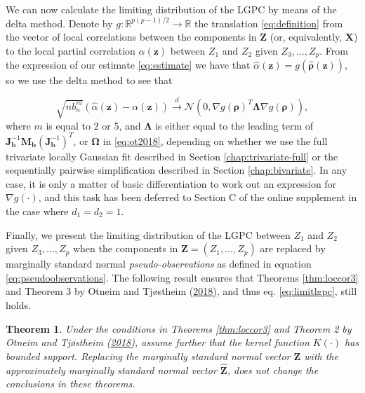 \documentclass[
  12pt,
  letterpaper]{article}
\newcommand{\X}{\bm{X}}
\newcommand{\Z}{\bm{Z}}
\newcommand{\z}{\bm{z}}
\newcommand{\hZ}{\widehat{\bm{Z}}}
\newcommand{\frho}{\bm{\rho}}
\newcommand{\hfrho}{\widehat{\bm{\rho}}}
\newcommand{\hh}{\bm{b}}
\newcommand{\halpha}{\widehat{\alpha}}
\newcommand{\fOmega}{\bm{\Omega}}
\newcommand{\fLambda}{\bm{\Lambda}}
\newcommand{\Jb}{\bm{J}_{\hh}}
\newcommand{\Mb}{\bm{M}_{\hh}}
\newtheorem{theorem}{Theorem}[section]
\theoremstyle{definition}
\theoremstyle{definition}
\theoremstyle{definition}
\theoremstyle{remark}
\begin{document}
We can now calculate the limiting distribution of the LGPC by means of the delta method. Denote by \(g: \mathbb{R}^{p(p-1)/2} \rightarrow \mathbb{R}\) the translation \eqref{eq:definition} from the vector of local correlations between the components in \(\Z\) (or, equivalently, \(\X\)) to the local partial correlation \(\alpha(\z)\) between \(Z_1\) and \(Z_2\) given \(Z_3, \ldots, Z_p\). From the expression of our estimate \eqref{eq:estimate} we have that \(\halpha(\z) = g(\hfrho(\z))\), so we use the delta method to see that

\begin{equation}
\sqrt{nb_n^m}\left(\halpha(\z) - \alpha(\z)\right) \stackrel{d}{\rightarrow} \mathcal{N}\left(0, \nabla g(\frho)^T\fLambda\nabla g(\frho)\right),
\label{eq:limitlgpc}
\end{equation}
where \(m\) is equal to 2 or 5, and \(\fLambda\) is either equal to the leading term of \(\Jb^{-1}\Mb(\Jb^{-1})^T\), or \(\fOmega\) in \eqref{eq:ot2018}, depending on whether we use the full trivariate locally Gaussian fit described in Section \ref{chap:trivariate-full} or the sequentially pairwise simplification described in Section \ref{chap:bivariate}. In any case, it is only a matter of basic differentiation to work out an expression for \(\nabla g(\cdot)\), and this task has been deferred to Section C of the online supplement in the case where \(d_1 = d_2 = 1\).

Finally, we present the limiting distribution of the LGPC between \(Z_1\) and \(Z_2\) given \(Z_3, \ldots, Z_p\) when the components in \(\Z = (Z_1, \ldots, Z_p)\) are replaced by marginally standard normal \emph{pseudo-observations} as defined in equation \eqref{eq:pseudoobservations}. The following result ensures that Theorems \ref{thm:loccor3} and Theorem 3 by Otneim and Tjøstheim (\protect\hyperlink{ref-otneim2017conditional}{2018}), and thus eq. \eqref{eq:limitlgpc}, still holds.

\vspace{.5cm}

\begin{theorem}
\protect\hypertarget{thm:pseudo}{}{\label{thm:pseudo} }Under the conditions in Theorems \ref{thm:loccor3} and Theorem 2 by Otneim and Tjøstheim (\protect\hyperlink{ref-otneim2017conditional}{2018}), assume further that the kernel function \(K(\cdot)\) has bounded support. Replacing the marginally standard normal vector \(\Z\) with the approximately marginally standard normal vector \(\hZ\), does not change the conclusions in these theorems.
\end{theorem}
\end{document}
